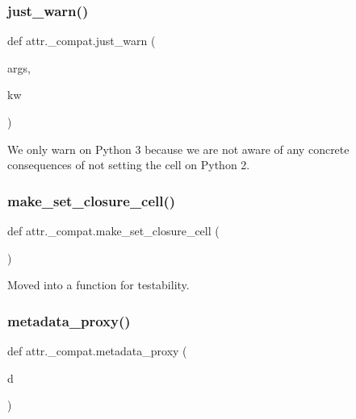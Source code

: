 \mbox{\label{namespaceattr_1_1__compat_a3f82c63c6aa5e9eec442a57c64f79ae4}} 
\subsubsection{\texorpdfstring{just\+\_\+warn()}{just\_warn()}}
{\footnotesize\ttfamily def attr.\+\_\+compat.\+just\+\_\+warn (\begin{DoxyParamCaption}\item[{}]{args,  }\item[{}]{kw }\end{DoxyParamCaption})}

\begin{DoxyVerb}We only warn on Python 3 because we are not aware of any concrete
consequences of not setting the cell on Python 2.
\end{DoxyVerb}
 \mbox{\label{namespaceattr_1_1__compat_a8dccbbea3bd8babd13634172c5c44fbd}} 
\subsubsection{\texorpdfstring{make\+\_\+set\+\_\+closure\+\_\+cell()}{make\_set\_closure\_cell()}}
{\footnotesize\ttfamily def attr.\+\_\+compat.\+make\+\_\+set\+\_\+closure\+\_\+cell (\begin{DoxyParamCaption}{ }\end{DoxyParamCaption})}

\begin{DoxyVerb}Moved into a function for testability.
\end{DoxyVerb}
 \mbox{\label{namespaceattr_1_1__compat_a03120022bfdae93d7cbd3cf95d667d53}} 
\subsubsection{\texorpdfstring{metadata\+\_\+proxy()}{metadata\_proxy()}}
{\footnotesize\ttfamily def attr.\+\_\+compat.\+metadata\+\_\+proxy (\begin{DoxyParamCaption}\item[{}]{d }\end{DoxyParamCaption})}



